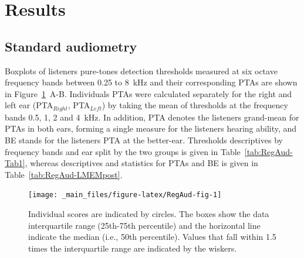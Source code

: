 \documentclass[a4paper, twoside]{templates/ociamthesis}
\begin{document}
\hypertarget{results-3}{%
\section{Results}\label{results-3}}

\hypertarget{standard-audiometry-1}{%
\subsection{Standard audiometry}\label{standard-audiometry-1}}

Boxplots of listeners pure-tones detection thresholds measured at six octave frequency bands between 0.25 to 8~kHz and their corresponding PTAs are shown in Figure~\ref{fig:RegAud-fig}~A-B. Individuals PTAs were calculated separately for the right and left ear (PTA\(_{Right}\), PTA\(_{Left}\)) by taking the mean of thresholds at the frequency bands 0.5, 1, 2 and 4~kHz. In addition, PTA denotes the listeners grand-mean for PTAs in both ears, forming a single measure for the listeners hearing ability, and BE stands for the listeners PTA at the better-ear. Thresholds descriptives by frequency bands and ear split by the two groups is given in Table~\ref{tab:RegAud-Tab1}, whereas descriptives and statistics for PTAs and BE is given in Table~\ref{tab:RegAud-LMEMpost}.

\begin{figure}

{\centering \texttt{[image: \_main\_files/figure-latex/RegAud-fig-1]} 

}

\caption{Individual scores are indicated by circles. The boxes show the data interquartile range (25th-75th percentile) and the horizontal line indicate the median (i.e., 50th percentile). Values that fall within 1.5 times the interquartile range are indicated by the wiskers.}\label{fig:RegAud-fig}
\end{figure}
\end{document}
